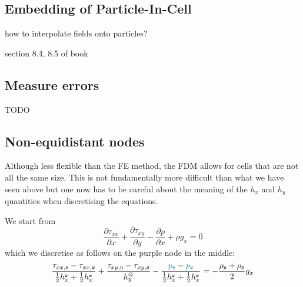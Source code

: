 \subsection{Embedding of Particle-In-Cell}

how to interpolate fields onto particles?

section 8.4, 8.5 of book

\subsection{Measure errors}

TODO

\subsection{Non-equidistant nodes \label{ss:fdm_stokes_hvar}}

Although less flexible than the FE method, the FDM allows for cells 
that are not all the same size.
This is not fundamentally more difficult than what we have seen above but 
one now has to be careful about the meaning of the $h_x$ and $h_y$
quantities when discretising the equations.  






We start from 
\[
\frac{\partial \tau_{xx}}{\partial x}  + 
\frac{\partial \tau_{xy}}{\partial y}  
- \frac{\partial p}{\partial x} + \rho g_x = 0
\]
which we discretise as follows on the purple node in the middle:
\[
\frac{\tau_{xx,{\tt e}}-\tau_{xx,{\tt w}}}{\frac12h_x^{\tt w}+\frac12h_x^{\tt e}} 
+ \frac{\tau_{xy,{\tt n}}-\tau_{xy,{\tt s}}}{h_y^\otimes} 
-\frac{{\color{teal}p_{\tt e}}-{\color{teal}p_{\tt w}}}{\frac12h_x^{\tt w}+\frac12h_x^{\tt e}} 
= -\frac{\rho_{\tt n}+\rho_{\tt s}}{2} g_x
\]

